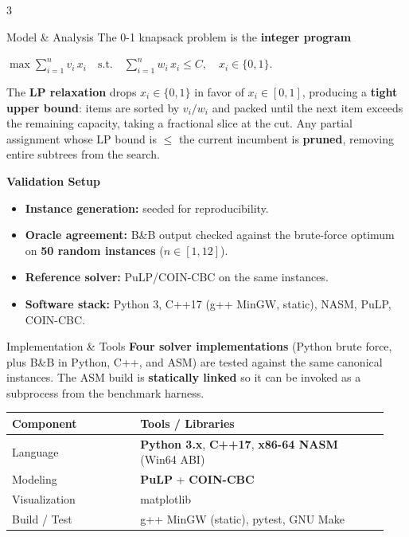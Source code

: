 \documentclass[a0,portrait]{a0poster}
\newcommand{\kw}[1]{\textcolor{BCDarkBlue}{\textbf{#1}}}
\newcommand{\KW}[1]{\textcolor{BCRed}{\textbf{#1}}}
\begin{document}
\begin{multicols}{3}
\begin{posterblock}{Model \& Analysis}
The 0-1 knapsack problem is the \kw{integer program}

\vspace{0.3em}
\begin{callout}
\centering\Large
$\displaystyle
\max \sum_{i=1}^{n} v_i\, x_i
\quad\text{s.t.}\quad
\sum_{i=1}^{n} w_i\, x_i \le C, \quad
x_i \in \{0, 1\}.
$
\end{callout}

The \KW{LP relaxation} drops $x_i \in \{0,1\}$ in favor of $x_i \in [0, 1]$, producing a \kw{tight upper bound}: items are sorted by $v_i / w_i$ and packed until the next item exceeds the remaining capacity, taking a fractional slice at the cut. Any partial assignment whose LP bound is $\le$ the current incumbent is \KW{pruned}, removing entire subtrees from the search.

\vspace{0.5em}
\textbf{Validation Setup}
\begin{itemize}[leftmargin=1.4em,itemsep=4pt,topsep=4pt]
  \item \kw{Instance generation:} seeded for reproducibility.
  \item \kw{Oracle agreement:} B\&B output checked against the brute-force optimum on \KW{50 random instances} ($n \in [1, 12]$).
  \item \kw{Reference solver:} PuLP/COIN-CBC on the same instances.
  \item \kw{Software stack:} Python 3, C++17 (g++ MinGW, static), NASM, PuLP, COIN-CBC.
\end{itemize}
\end{posterblock}

\begin{posterblock}{Implementation \& Tools}
\KW{Four solver implementations} (Python brute force, plus B\&B in Python, C++, and ASM) are tested against the same canonical instances. The ASM build is \kw{statically linked} so it can be invoked as a subprocess from the benchmark harness.

\vspace{0.4em}
\renewcommand{\arraystretch}{1.3}
\begin{tabular}{@{}p{0.32\linewidth}p{0.62\linewidth}@{}}
\toprule
\textbf{Component} & \textbf{Tools / Libraries} \\
\midrule
Language       & \kw{Python 3.x}, \kw{C++17}, \kw{x86-64 NASM} (Win64 ABI) \\
Modeling       & \kw{PuLP} + \kw{COIN-CBC} \\
Visualization  & matplotlib \\
Build / Test   & g++ MinGW (static), pytest, GNU Make \\
\bottomrule
\end{tabular}


\end{posterblock}
\end{multicols}
\end{document}
